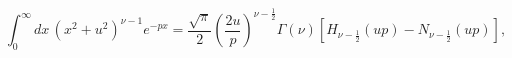 \begin{equation}
\int _{0}^{\infty }dx\, \left(x^{2}+u^{2}\right)^{\nu -1}e^{-px}=\frac{\sqrt{\pi }}{2}\left(\frac{2u}{p}\right)^{\nu -\frac{1}{2}}\Gamma \left(\nu \right)\left[H_{\nu -\frac{1}{2}}\left(up\right)-N_{\nu -\frac{1}{2}}\left(up\right)\right],\label{Grad Int 2}\end{equation}

